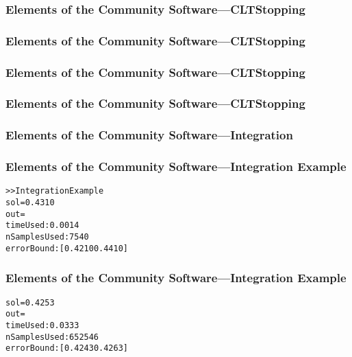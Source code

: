 \documentclass[11pt,compress,xcolor={usenames,dvipsnames},aspectratio=169]{beamer}
\begin{document}
\begin{frame}[fragile]
\frametitle{Elements of the Community Software---CLTStopping}
\vspace{-5ex}

\end{frame}


\begin{frame}[fragile]
\frametitle{Elements of the Community Software---CLTStopping}
\vspace{-5ex}

\end{frame}


\begin{frame}[fragile]
\frametitle{Elements of the Community Software---CLTStopping}
\vspace{-5ex}

\end{frame}

\begin{frame}[fragile]
\frametitle{Elements of the Community Software---CLTStopping}
\vspace{-5ex}

\end{frame}

\begin{frame}[fragile]
\frametitle{Elements of the Community Software---Integration}
\vspace{-5ex}

\end{frame}

\begin{frame}[fragile]
\frametitle{Elements of the Community Software---Integration Example}
\vspace{-5ex}


\begin{alltt}
>> IntegrationExample
sol = 0.4310
out = 
timeUsed: 0.0014
nSamplesUsed: 7540
errorBound: [0.4210 0.4410]
\end{alltt}
\end{frame}

\begin{frame}[fragile]
\frametitle{Elements of the Community Software---Integration Example}
\vspace{-5ex}


\begin{alltt}
sol = 0.4253
out = 
timeUsed: 0.0333
nSamplesUsed: 652546
errorBound: [0.4243 0.4263]
\end{alltt}
\end{frame}
\end{document}
